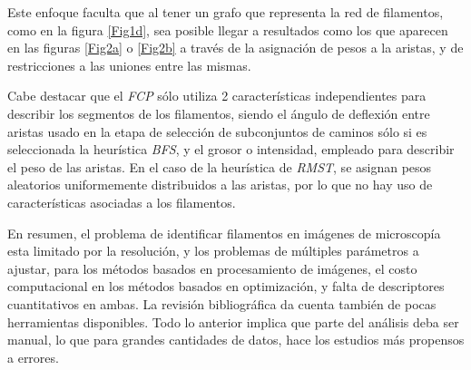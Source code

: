     
Este enfoque faculta que al tener un grafo que representa la red de filamentos, como en la figura \ref{Fig1d}, sea posible llegar a resultados como los que aparecen en las figuras \ref{Fig2a} o \ref{Fig2b} a trav\'es de la asignaci\'on de pesos a la aristas, y de restricciones a las uniones entre las mismas. 


Cabe destacar que el {\it FCP} s\'olo utiliza 2 caracter\'isticas independientes para describir los segmentos de los filamentos, siendo el \'angulo de deflexi\'on entre aristas usado en la etapa de selecci\'on de subconjuntos de caminos s\'olo si es seleccionada la heur\'istica {\it BFS}, y el grosor o intensidad, empleado para describir el peso de las aristas. En el caso de la heur\'istica de {\it RMST}, se asignan pesos aleatorios uniformemente distribuidos a las aristas, por lo que no hay uso de caracter\'isticas asociadas a los filamentos.


En resumen, el problema de identificar filamentos en im\'agenes de microscop\'ia esta limitado por la resoluci\'on, y los problemas de m\'ultiples par\'ametros a ajustar, para los m\'etodos basados en procesamiento de im\'agenes, el costo computacional en los m\'etodos basados en optimizaci\'on, y falta de descriptores cuantitativos en ambas. La revisi\'on bibliogr\'afica da cuenta tambi\'en de pocas herramientas disponibles. Todo lo anterior implica que parte del an\'alisis deba ser manual, lo que para grandes cantidades de datos, hace los estudios m\'as propensos a errores. 


